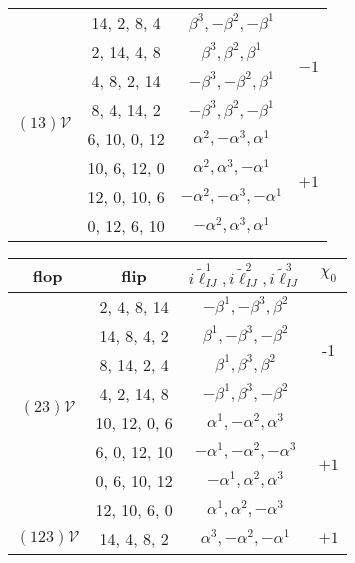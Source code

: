 \begin{table}[!htbp]
\begin{tabular}{|c|c|c|c|}
			\multirow{8}{*}{$(13)\mathcal{V}$} & 14, 2, 8, 4 & $\beta ^3,-\beta ^2,-\beta ^1$& \multirow{4}{*}{$-1$}\\
			\cline{2-3}
			&2, 14, 4, 8& $\beta ^3,\beta ^2,\beta ^1$& \\
			\cline{2-3} 
			&4, 8, 2, 14& $-\beta ^3,-\beta ^2,\beta ^1$& \\
			\cline{2-3} 
			&8, 4, 14, 2& $-\beta ^3,\beta ^2,-\beta ^1$   & \\
			\cline{2-4} 
			&6, 10, 0, 12& $\alpha ^2,-\alpha ^3,\alpha ^1$   & \multirow{4}{*}{$+1$} \\
			\cline{2-3} 
			&10, 6, 12, 0& $\alpha ^2,\alpha ^3,-\alpha ^1$   & \\
			\cline{2-3} 
			&12, 0, 10, 6& $-\alpha ^2,-\alpha ^3,-\alpha ^1$   & \\
			\cline{2-3} 
			&0, 12, 6, 10& $-\alpha ^2,\alpha ^3,\alpha ^1$& \\
			\hline
			\hline
	\end{tabular}
	\quad
	\begin{tabular}{|c|c|c|c|}
		\hline
		flop & flip & $i\tilde{\ell}_{IJ}^1, i\tilde{\ell}_{IJ}^2, i\tilde{\ell}_{IJ}^3 $ & $\chi_0$ \\
			\hline
			\multirow{8}{*}{$(23)\mathcal{V}$} & 2, 4, 8, 14 & $-\beta ^1,-\beta ^3,\beta ^2$& \multirow{4}{*}{-1}\\
			\cline{2-3}
			&14, 8, 4, 2& $\beta ^1,-\beta ^3,-\beta ^2$& \\
			\cline{2-3} 
			&8, 14, 2, 4& $\beta ^1,\beta ^3,\beta ^2$ & \\
			\cline{2-3} 
			&4, 2, 14, 8& $-\beta ^1,\beta ^3,-\beta ^2$  & \\
			\cline{2-4} 
			&10, 12, 0, 6& $\alpha ^1,-\alpha ^2,\alpha ^3$   & \multirow{4}{*}{$+1$} \\
			\cline{2-3} 
			&6, 0, 12, 10&  $-\alpha ^1,-\alpha ^2,-\alpha ^3$  & \\
			\cline{2-3} 
			&0, 6, 10, 12&  $-\alpha ^1,\alpha ^2,\alpha ^3$  & \\
			\cline{2-3} 
			&12, 10, 6, 0& $\alpha ^1,\alpha ^2,-\alpha ^3$& \\
			\hline
			\hline
			\multirow{8}{*}{$(123)\mathcal{V}$} & 14, 4, 8, 2 & $\alpha ^3,-\alpha ^2,-\alpha ^1$ & \multirow{4}{*}{$+1$}\\

\end{tabular}
\end{table}

